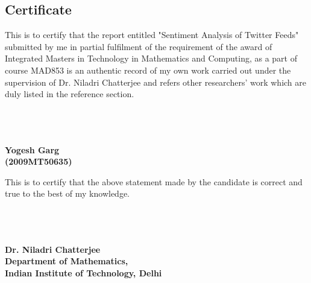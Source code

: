 \begin{center}
	\section*{Certificate}
\end{center}

This is to certify that the report entitled "Sentiment Analysis of Twitter Feeds" submitted by me
	in partial fulfilment of the requirement of the award of Integrated Masters in Technology in Mathematics and Computing,
	as a part of course MAD853 is an authentic record of my own work carried out under the supervision of Dr. Niladri Chatterjee and
	refers other researchers' work which are duly listed in the reference section.\\
\\
\\
\\
\begin{flushright}\textbf{
Yogesh Garg\\
(2009MT50635)}
\end{flushright}
\vspace{100pt}

This is to certify that the above statement made by the candidate is correct and true to the best of my knowledge.\\
\\
\\
\\
\begin{flushright}\textbf{
Dr. Niladri Chatterjee\\
Department of Mathematics,\\
Indian Institute of Technology, Delhi\\}
\end{flushright}
\vspace{100pt}